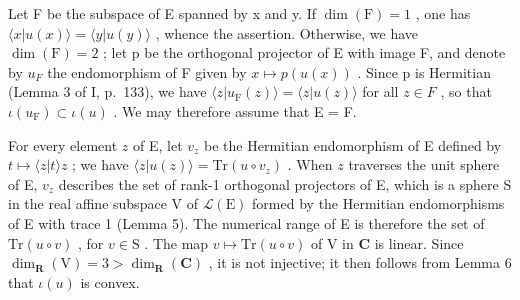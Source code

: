 Let F be the subspace of E spanned by x and y. If \(\dim(\mathrm{F}) = 1\) , one has \(\langle x|u(x)\rangle = \langle y|u(y)\rangle\) , whence the assertion. Otherwise, we have \(\dim(\mathrm{F}) = 2\) ; let p be the orthogonal projector of E with image F, and denote by \(u_{F}\) the endomorphism of F given by \(x \mapsto p(u(x))\) . Since p is Hermitian (Lemma 3 of I, p.~133), we have \(\langle z|u_{\mathrm{F}}(z)\rangle = \langle z|u(z)\rangle\) for all \(z \in F\) , so that \(\iota(u_{\mathrm{F}}) \subset \iota(u)\) . We may therefore assume that E = F.

For every element \(z\) of E, let \(v_{z}\) be the Hermitian endomorphism of E defined by \(t \mapsto \langle z|t\rangle z\) ; we have \(\langle z|u(z)\rangle = \mathrm{Tr}(u \circ v_{z})\) . When \(z\) traverses the unit sphere of E, \(v_{z}\) describes the set of rank-1 orthogonal projectors of E, which is a sphere S in the real affine subspace V of \(\mathcal{L}(\mathrm{E})\) formed by the Hermitian endomorphisms of E with trace 1 (Lemma 5). The numerical range of E is therefore the set of \(\mathrm{Tr}(u \circ v)\) , for \(v \in \mathrm{S}\) . The map \(v \mapsto \mathrm{Tr}(u \circ v)\) of V in \(\mathbf{C}\) is linear. Since \(\dim_{\mathbf{R}}(\mathrm{V}) = 3 > \dim_{\mathbf{R}}(\mathbf{C})\) , it is not injective; it then follows from Lemma 6 that \(\iota(u)\) is convex.

